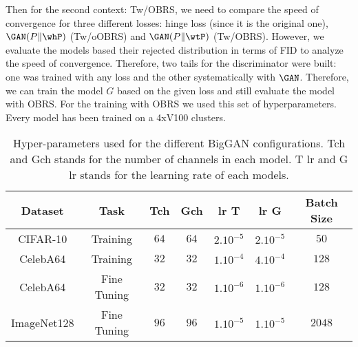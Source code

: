 \documentclass[twoside]{article}
\begin{document}
Then for the second context: Tw/OBRS, we need to compare the speed of convergence for three different losses: hinge loss (since it is the original one), $\GAN(P\Vert \whP)$ (Tw/oOBRS) and $\GAN(P\Vert \wtP)$ (Tw/OBRS). However, we evaluate the models based their rejected distribution in terms of FID to analyze the speed of convergence.  Therefore,  two tails for the discriminator were built: one was trained with any loss and the other systematically with $\GAN$. Therefore, we can train the model $G$ based on the given loss and still evaluate the model with OBRS. For the training with OBRS we used this set of hyperparameters. Every model has been trained on a 4xV100 clusters. 


\begin{table}[H]
    \centering
    \begin{tabular}{|c|c|ccccc|}
    \hline
       Dataset  & Task  & Tch & Gch & lr T & lr G & Batch Size  \\\hline
        CIFAR-10 & Training & $64$ & $64$ & $2.10^{-5}$ & $2.10^{-5}$ & $50$   \\ 
        CelebA64 & Training & $32$ & $32$ & $1.10^{-4}$ & $4.10^{-4}$ & $128$   \\ 
        CelebA64 & Fine Tuning & $32$ & $32$ & $1.10^{-6}$ & $1.10^{-6}$ & $128$   \\ 
       ImageNet128 & Fine Tuning & $96$ & $96$ & $1.    10^{-5}$ & $1.10^{-5}$ & $2048$   \\ 
\hline
    \end{tabular}
    \caption{Hyper-parameters used for the different BigGAN configurations. Tch and Gch stands for the number of channels in each model. T lr and G lr stands for the learning rate of each models.}
    \label{tab:my_label}
\end{table}

















\clearpage{}
\end{document}
